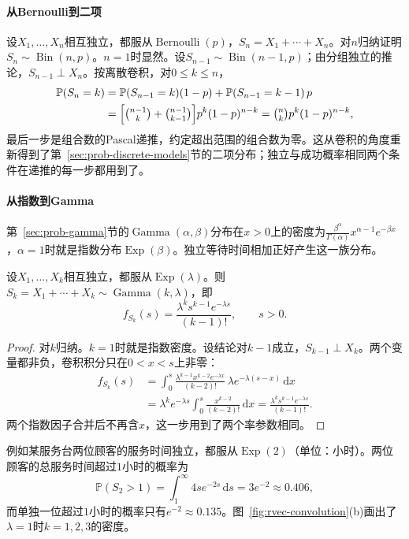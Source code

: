 \paragraph{从Bernoulli到二项}
设$X_1,\ldots,X_n$相互独立，都服从$\operatorname{Bernoulli}(p)$，$S_n=X_1+\cdots+X_n$。对$n$归纳证明$S_n\sim\operatorname{Bin}(n,p)$。$n=1$时显然。设$S_{n-1}\sim\operatorname{Bin}(n-1,p)$；由分组独立的推论，$S_{n-1}\perp X_n$。按离散卷积，对$0\le k\le n$，
\[
\begin{aligned}
 \mathbb P(S_n=k)&=\mathbb P(S_{n-1}=k)(1-p)+\mathbb P(S_{n-1}=k-1)\,p\\
 &=\Bigl[\tbinom{n-1}{k}+\tbinom{n-1}{k-1}\Bigr]p^k(1-p)^{n-k}=\tbinom nkp^k(1-p)^{n-k},
\end{aligned}
\]
最后一步是组合数的Pascal递推，约定超出范围的组合数为零。这从卷积的角度重新得到了第~\ref{sec:prob-discrete-models}节的二项分布；独立与成功概率相同两个条件在递推的每一步都用到了。

\paragraph{从指数到Gamma}
第~\ref{sec:prob-gamma}节的$\operatorname{Gamma}(\alpha,\beta)$分布在$x>0$上的密度为$\frac{\beta^\alpha}{\Gamma(\alpha)}x^{\alpha-1}e^{-\beta x}$，$\alpha=1$时就是指数分布$\operatorname{Exp}(\beta)$。独立等待时间相加正好产生这一族分布。

\begin{theorem}[同率指数变量之和]
\label{thm:rvec-exponential-sum}
设$X_1,\ldots,X_k$相互独立，都服从$\operatorname{Exp}(\lambda)$。则$S_k=X_1+\cdots+X_k\sim\operatorname{Gamma}(k,\lambda)$，即
\[
 f_{S_k}(s)=\frac{\lambda^ks^{k-1}e^{-\lambda s}}{(k-1)!},\qquad s>0 .
\]
\end{theorem}

\begin{proof}
对$k$归纳。$k=1$时就是指数密度。设结论对$k-1$成立，$S_{k-1}\perp X_k$。两个变量都非负，卷积积分只在$0<x<s$上非零：
\[
\begin{aligned}
 f_{S_k}(s)&=\int_0^s\frac{\lambda^{k-1}x^{k-2}e^{-\lambda x}}{(k-2)!}\,\lambda e^{-\lambda(s-x)}\,\mathrm dx\\
 &=\lambda^ke^{-\lambda s}\int_0^s\frac{x^{k-2}}{(k-2)!}\,\mathrm dx=\frac{\lambda^ks^{k-1}e^{-\lambda s}}{(k-1)!} .
\end{aligned}
\]
两个指数因子合并后不再含$x$，这一步用到了两个率参数相同。
\end{proof}

例如某服务台两位顾客的服务时间独立，都服从$\operatorname{Exp}(2)$（单位：小时）。两位顾客的总服务时间超过$1$小时的概率为
\[
 \mathbb P(S_2>1)=\int_1^\infty4se^{-2s}\,\mathrm ds=3e^{-2}\approx0.406 ,
\]
而单独一位超过$1$小时的概率只有$e^{-2}\approx0.135$。图~\ref{fig:rvec-convolution}(b)画出了$\lambda=1$时$k=1,2,3$的密度。

